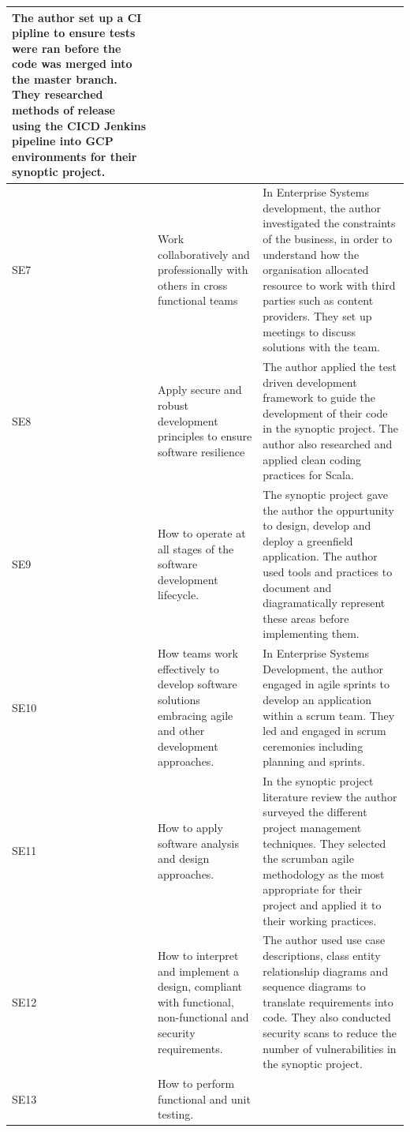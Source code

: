 \documentclass{article}
\begin{document}
\begin{landscape}
\begin{longtable}{|l|p{10cm}|p{10cm}|}
  The author set up a CI pipline   to ensure tests were ran before the code was merged into the master branch.   They researched methods of release using the CICD Jenkins pipeline into GCP   environments for their synoptic project. \\ \hline
SE7 &
  Work collaboratively and   professionally with others in cross functional teams &
  In Enterprise Systems   development, the author investigated the constraints of the business, in   order to understand how the organisation allocated resource to work with   third parties such as content providers. They set up meetings to discuss   solutions with the team. \\ \hline
SE8 &
  Apply secure and robust   development principles to ensure software resilience &
  The author applied the test   driven development framework to guide the development of their code in the   synoptic project. The author also researched and applied clean coding   practices for Scala. \\ \hline
SE9 &
  How to operate at all stages   of the software development lifecycle. &
  The synoptic project gave the   author the oppurtunity to design, develop and deploy a greenfield   application. The author used tools and practices to document and   diagramatically represent these areas before implementing them. \\ \hline
SE10 &
  How teams work effectively to   develop software solutions embracing agile and other development approaches. &
  In Enterprise Systems   Development, the author engaged in agile sprints to develop an application   within a scrum team. They led and engaged in scrum ceremonies including   planning and sprints. \\ \hline
SE11 &
  How to apply software analysis   and design approaches. &
  In the synoptic project   literature review the author surveyed the different project management   techniques. They selected the scrumban agile methodology as the most   appropriate for their project and applied it to their working practices. \\ \hline
SE12 &
  How to interpret and implement   a design, compliant with functional, non-functional and security   requirements. &
  The author used use case   descriptions, class entity relationship diagrams and sequence diagrams to   translate requirements into code. They also conducted security scans to   reduce the number of vulnerabilities in the synoptic project. \\ \hline
SE13 &
  How to perform functional and   unit testing. &

\end{longtable}
\end{landscape}
\end{document}

